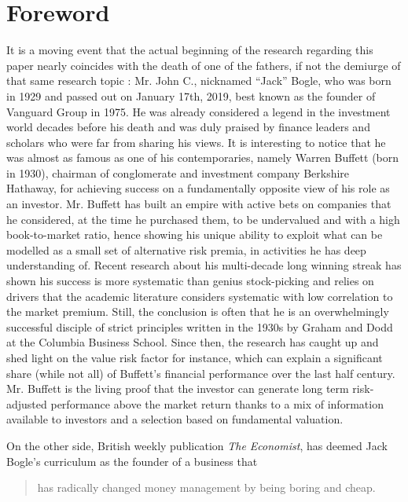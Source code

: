 \section{Foreword}
It is a moving event that the actual beginning of the research regarding this paper nearly coincides with the death of one of the fathers, if not the demiurge of that same research topic : Mr. John C., nicknamed ``Jack'' Bogle, who was born in 1929 and passed out on January 17th, 2019, best known as the founder of Vanguard Group in 1975. He was already considered a legend in the investment world decades before his death and was duly praised by finance leaders and scholars who were far from sharing his views. It is interesting to notice that he was almost as famous as one of his contemporaries, namely Warren Buffett (born in 1930), chairman of conglomerate and investment company Berkshire Hathaway, for achieving success on a fundamentally opposite view of his role as an investor. Mr. Buffett has built an empire with active bets on companies that he considered, at the time he purchased them, to be undervalued and with a high book-to-market ratio, hence showing his unique ability to exploit what can be modelled as a small set of alternative risk premia, in activities he has deep understanding of. Recent research about his multi-decade long winning streak has shown his success is more systematic than genius stock-picking and relies on drivers that the academic literature considers systematic with low correlation to the market premium. Still, the conclusion is often that he is an overwhelmingly successful disciple of strict principles written in the 1930s by Graham and Dodd at the Columbia Business School. Since then, the research has caught up and shed light on the value risk factor for instance, which can explain a significant share (while not all) of Buffett's financial performance over the last half century. Mr. Buffett is the living proof that the investor can generate long term risk-adjusted performance above the market return thanks to a mix of information available to investors and a selection based on fundamental valuation. 

On the other side, British weekly publication \textit{The Economist}, has deemed Jack Bogle's curriculum as the founder of a business that
\begin{quotation}
has radically changed money management by being boring and cheap.
\end{quotation}

